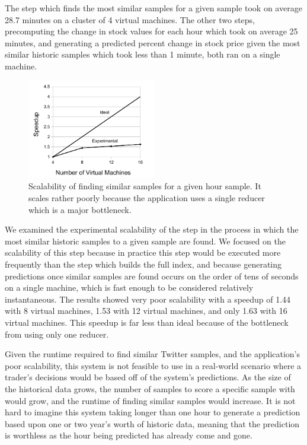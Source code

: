 \documentclass[twocolumn]{article}
\begin{document}
The step which finds the most similar samples for a given sample took on average 28.7 minutes on a cluster of 4 virtual machines. The other two steps, precomputing the change in stock values for each hour which took on average 25 minutes, and generating a predicted percent change in stock price given the most similar historic samples which took less than 1 minute, both ran on a single machine.

\begin{figure}
\centering
\includegraphics[width=0.5\textwidth]{speedup}
\caption{Scalability of finding similar samples for a given hour sample. It scales rather poorly because the application uses a single reducer which is a major bottleneck.}
\label{speedup}
\end{figure}

We examined the experimental scalability of the step in the process in which the most similar historic samples to a given sample are found. We focused on the scalability of this step because in practice this step would be executed more frequently than the step which builds the full index, and because generating predictions once similar samples are found occurs on the order of tens of seconds on a single machine, which is fast enough to be considered relatively instantaneous. The results showed very poor scalability with a speedup of 1.44 with 8 virtual machines, 1.53 with 12 virtual machines, and only 1.63 with 16 virtual machines. This speedup is far less than ideal because of the bottleneck from using only one reducer.

Given the runtime required to find similar Twitter samples, and the application’s poor scalability, this system is not feasible to use in a real-world scenario where a trader’s decisions would be based off of the system’s predictions. As the size of the historical data grows, the number of samples to score a specific sample with would grow, and the runtime of finding similar samples would increase. It is not hard to imagine this system taking longer than one hour to generate a prediction based upon one or two year’s worth of historic data, meaning that the prediction is worthless as the hour being predicted has already come and gone.
\end{document}
